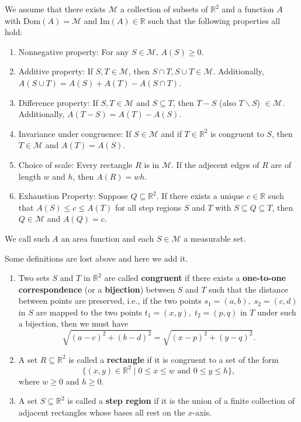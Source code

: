 \documentclass[a4paper]{ctexart}
\begin{document}
	\begin{mydef}
		We assume that there exists $\mathscr{M}$ a collection of subsets of $\mathbb{R}^2$ and a function $A$ with $\mathrm{Dom}(A)=\mathscr{M}$ and $\mathrm{Im}(A)\in \mathbb{R}$ such that the following properties all hold:
		\begin{enumerate}
			\item Nonnegative property: For any $S\in \mathscr{M}$, $A(S)\ge 0$.
			\item Additive property: If $S,T \in \mathscr{M}$, then $S\cap T,S\cup T \in \mathscr{M}$. Additionally, $A(S\cup T)=A(S)+A(T)-A(S\cap T)$.
			\item Difference property: If $S,T \in \mathscr{M}$ and $S \subseteq T$, then $T-S$ (also $T\backslash S$) $\in \mathscr{M}$. Additionally, $A(T-S)=A(T)-A(S)$.
			\item Invariance under congruence: If $S\in \mathscr{M}$ and if $T\in \mathbb{R}^2$ is congruent to $S$, then $T \in \mathscr{M}$ and $A(T)=A(S)$.
			\item Choice of scale: Every rectangle $R$ is in $\mathscr{M}$. If the adjecent edges of $R$ are of length $w$ and $h$, then $A(R)=wh$.
			\item Exhaustion Property: Suppose $Q\subseteq \mathbb{R}^2$. If there exists a unique $c\in \mathbb{R}$ such that $A(S)\le c \le A(T)$ for all step regions $S$ and $T$ with $S\subseteq Q \subseteq T$, then $Q\in \mathscr{M}$ and $A(Q)=c$.
		\end{enumerate}
		We call such $A$ an area function and each $S\in \mathscr{M}$ a measurable set.
	\end{mydef}
	\begin{mydef}[Additional] Some definitions are lost above and here we add it.
		\begin{enumerate}
			\item Two sets $S$ and $T$ in $\mathbb{R}^2$ are called \textbf{congruent} if there exists a \textbf{one-to-one correspondence} (or a \textbf{bijection}) between $S$ and $T$ such that the distance between points are preserved, i.e., if the two points 
			$s_1 = (a,b), \; s_2 = (c,d)$ in $S$ are mapped to the two points 
			$t_1 = (x,y), \; t_2 = (p,q)$ in $T$ under such a bijection, then we must have
			\[
			\sqrt{(a - c)^2 + (b - d)^2} = \sqrt{(x - p)^2 + (y - q)^2}.
			\]
			\item A set $R \subseteq \mathbb{R}^2$ is called a \textbf{rectangle} if it is congruent to a set of the form
			\[
			\{ (x,y) \in \mathbb{R}^2 \mid 0 \le x \le w \text{ and } 0 \le y \le h \},
			\]
			where $w \ge 0$ and $h \ge 0$.
			\item A set $S \subseteq \mathbb{R}^2$ is called a \textbf{step region} if it is the union of a finite collection of 
			adjacent rectangles whose bases all rest on the $x$-axis.
		\end{enumerate}
	\end{mydef}
\end{document}
